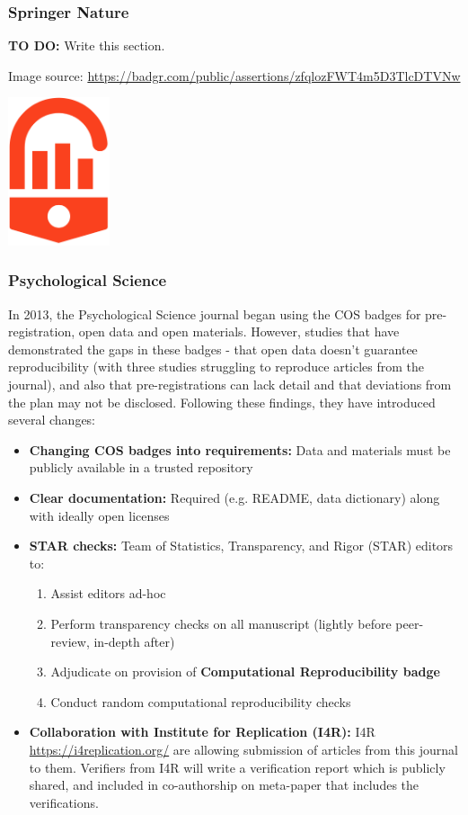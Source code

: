 \subsubsection{Springer Nature}

\textbf{TO DO:} Write this section.

Image source: \url{https://badgr.com/public/assertions/zfqlozFWT4m5D3TlcDTVNw}

\includegraphics[width=3cm]{images/springer_open_data_badge.png}

\subsubsection{Psychological Science}

In 2013, the Psychological Science journal began using the COS badges for pre-registration, open data and open materials. However, studies that have demonstrated the gaps in these badges - that open data doesn't guarantee reproducibility (with three studies struggling to reproduce articles from the journal), and also that pre-registrations can lack detail and that deviations from the plan may not be disclosed. Following these findings, they have introduced several changes:

\begin{itemize}
    \item \textbf{Changing COS badges into requirements:} Data and materials must be publicly available in a trusted repository
    \item \textbf{Clear documentation:} Required (e.g. README, data dictionary) along with ideally open licenses
    \item \textbf{STAR checks:} Team of Statistics, Transparency, and Rigor (STAR) editors to:
    \begin{enumerate}
        \item Assist editors ad-hoc
        \item Perform transparency checks on all manuscript (lightly before peer-review, in-depth after)
        \item Adjudicate on provision of \textbf{Computational Reproducibility badge}
        \item Conduct random computational reproducibility checks
    \end{enumerate}
    \item \textbf{Collaboration with Institute for Replication (I4R):} I4R \url{https://i4replication.org/} are allowing submission of articles from this journal to them. Verifiers from I4R will write a verification report which is publicly shared, and included in co-authorship on meta-paper that includes the verifications.
\end{itemize}